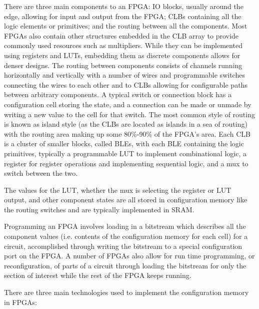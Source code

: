 \documentclass[12pt,final,oneside]{dwThesis} %
\begin{document}
   There are three main components to an \gls{FPGA}: \gls{IO} blocks, usually
   around the edge, allowing for input and output from the \gls{FPGA};
   \glspl{CLB} containing all the logic elements or \glspl{primitive}; and the
   routing between all the components.  Most \glspl{FPGA} also contain other
   structures embedded in the \gls{CLB} array to provide commonly used
   resources such as multipliers. While they can be implemented using registers
   and \glspl{LUT}, embedding them as discrete components allows for denser
   designs.  The routing between components consists of channels running
   horizontally and vertically with a number of wires and programmable switches
   connecting the wires to each other and to \glspl{CLB} allowing for
   configurable paths between arbitrary components. A typical switch or
   connection block has a configuration cell storing the state, and a
   connection can be made or unmade by writing a new value to the cell for that
   switch. The most common style of routing is known as island style (as the
   \glspl{CLB} are located as islands in a sea of routing) with the routing
   area making up some 80\%-90\% of the \gls{FPGA}'s area\cite{FPGAArch}.  Each
   \gls{CLB} is a cluster of smaller blocks, called \glspl{BLE}, with each
   \gls{BLE} containing the logic primitives, typically a programmable
   \gls{LUT} to implement combinational logic, a register for register operations
   and implementing sequential logic, and a \gls{mux} to switch between the
   two.
   
   The values for the \gls{LUT}, whether the \gls{mux} is selecting the
   register or \gls{LUT} output, and other component states are all stored in
   configuration memory like the routing switches and are typically implemented
   in \gls{SRAM}.
   
   Programming an \gls{FPGA} involves loading in a bitstream which describes
   all the component values (i.e. contents of the configuration memory for each
   cell) for a circuit, accomplished through writing the bitstream to a special
   configuration port on the \gls{FPGA}. A number of \glspl{FPGA} also allow
   for run time programming, or reconfiguration, of parts of a circuit through
   loading the bitstream for only the section of interest while the rest of the
   \gls{FPGA} keeps running.

    There are three main
   technologies used to implement the configuration memory in \glspl{FPGA}:
\end{document}
